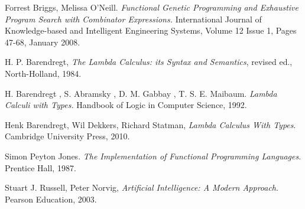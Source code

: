 \documentclass[conference]{IEEEtran}
\begin{document}
\begin{thebibliography}{22}
Forrest Briggs, Melissa O’Neill.
\emph{Functional Genetic Programming and Exhaustive
Program Search with Combinator Expressions.}
International Journal of Knowledge-based and Intelligent Engineering Systems,
Volume 12 Issue 1, Pages 47-68, January 2008. 


H. P. Barendregt,
\emph{The Lambda Calculus: its Syntax and Semantics}, 
revised ed., North-Holland, 1984.

H. Barendregt , S. Abramsky , D. M. Gabbay , T. S. E. Maibaum.
\emph{Lambda Calculi with Types.} 
Handbook of Logic in Computer Science, 1992. 


  Henk Barendregt, Wil Dekkers, Richard Statman,
  \emph{Lambda Calculus With Types}.
  Cambridge University Press,
  2010. 

Simon Peyton Jones. 
\emph{The Implementation of Functional Programming Languages}. 
Prentice Hall, 1987.


	Stuart J. Russell, Peter Norvig,
	\emph{Artificial Intelligence: A Modern Approach}.
	Pearson Education,
	2003. 


\end{thebibliography}

\end{document}
